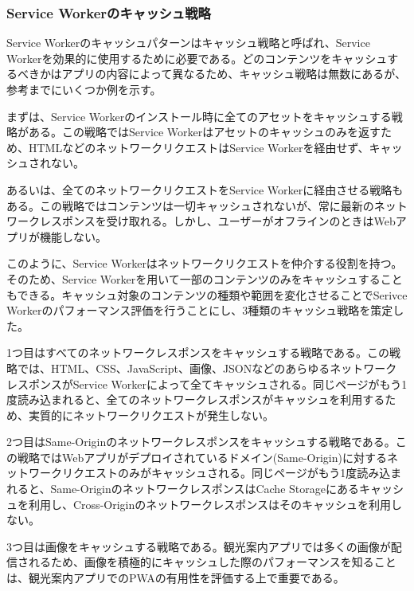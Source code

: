 \subsubsection{Service Workerのキャッシュ戦略}\label{Service Workerのキャッシュパターン}
Service Workerのキャッシュパターンはキャッシュ戦略と呼ばれ、Service Workerを効果的に使用するために必要である。どのコンテンツをキャッシュするべきかはアプリの内容によって異なるため、キャッシュ戦略は無数にあるが、参考までにいくつか例を示す。

まずは、Service Workerのインストール時に全てのアセットをキャッシュする戦略がある。この戦略ではService Workerはアセットのキャッシュのみを返すため、HTMLなどのネットワークリクエストはService Workerを経由せず、キャッシュされない。

あるいは、全てのネットワークリクエストをService Workerに経由させる戦略もある。この戦略ではコンテンツは一切キャッシュされないが、常に最新のネットワークレスポンスを受け取れる。しかし、ユーザーがオフラインのときはWebアプリが機能しない。

このように、Service Workerはネットワークリクエストを仲介する役割を持つ。そのため、Service Workerを用いて一部のコンテンツのみをキャッシュすることもできる。キャッシュ対象のコンテンツの種類や範囲を変化させることでSerivce Workerのパフォーマンス評価を行うことにし、3種類のキャッシュ戦略を策定した。

1つ目はすべてのネットワークレスポンスをキャッシュする戦略である。この戦略では、HTML、CSS、JavaScript、画像、JSONなどのあらゆるネットワークレスポンスがService Workerによって全てキャッシュされる。同じページがもう1度読み込まれると、全てのネットワークレスポンスがキャッシュを利用するため、実質的にネットワークリクエストが発生しない。

2つ目はSame-Originのネットワークレスポンスをキャッシュする戦略である。この戦略ではWebアプリがデプロイされているドメイン(Same-Origin)に対するネットワークリクエストのみがキャッシュされる。同じページがもう1度読み込まれると、Same-OriginのネットワークレスポンスはCache Storageにあるキャッシュを利用し、Cross-Originのネットワークレスポンスはそのキャッシュを利用しない。

3つ目は画像をキャッシュする戦略である。観光案内アプリでは多くの画像が配信されるため、画像を積極的にキャッシュした際のパフォーマンスを知ることは、観光案内アプリでのPWAの有用性を評価する上で重要である。